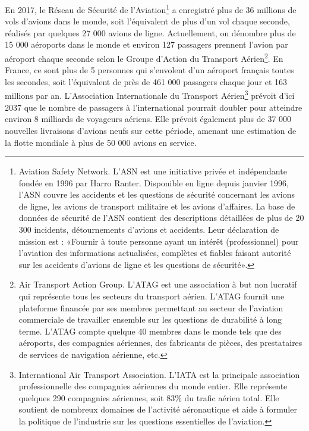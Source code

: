 En 2017, le Réseau de Sécurité de l'Aviation\footnote{Aviation Safety Network. L'ASN est une initiative privée et indépendante fondée en 1996 par Harro Ranter. Disponible en ligne depuis janvier 1996, l'ASN couvre les accidents et les questions de sécurité concernant les avions de ligne, les avions de transport militaire et les avions d'affaires. La base de données de sécurité de l'ASN contient des descriptions détaillées de plus de 20 300 incidents, détournements d'avions et accidents. Leur déclaration de mission est : «Fournir à toute personne ayant un intérêt (professionnel) pour l'aviation des informations actualisées, complètes et fiables faisant autorité sur les accidents d'avions de ligne et les questions de sécurité».} a enregistré plus de 36 millions de vols d'avions dans le monde, soit l'équivalent de plus d'un vol chaque seconde, réalisés par quelques 27 000 avions de ligne. 
Actuellement, on dénombre plus de 15 000 aéroports dans le monde et environ 127 passagers prennent l'avion par aéroport chaque seconde selon le Groupe d'Action du Transport Aérien\footnote{Air Transport Action Group. L'ATAG est une association à but non lucratif qui représente tous les secteurs du transport aérien. L'ATAG fournit une plateforme financée par ses membres permettant au secteur de l'aviation commerciale de travailler ensemble sur les questions de durabilité à long terme. L'ATAG compte quelque 40 membres dans le monde tels que des aéroports, des compagnies aériennes, des fabricants de pièces, des prestataires de services de navigation aérienne, etc.}. 
En France, ce sont plus de 5 personnes qui s'envolent d'un aéroport français toutes les secondes, soit l'équivalent de près de 461 000 passagers chaque jour et 163 millions par an. 
L’Association Internationale du Transport Aérien\footnote{International Air Transport Association. L'IATA est la principale association professionnelle des compagnies aériennes du monde entier. Elle représente quelques 290 compagnies aériennes, soit 83\% du trafic aérien total. Elle soutient de nombreux domaines de l'activité aéronautique et aide à formuler la politique de l'industrie sur les questions essentielles de l'aviation.} prévoit d’ici 2037 que le nombre de passagers à l'international pourrait doubler pour atteindre environ 8 milliards de voyageurs aériens. 
Elle prévoit également plus de 37 000 nouvelles livraisons d’avions neufs sur cette période, amenant une estimation de la flotte mondiale à plus de 50 000 avions en service.


